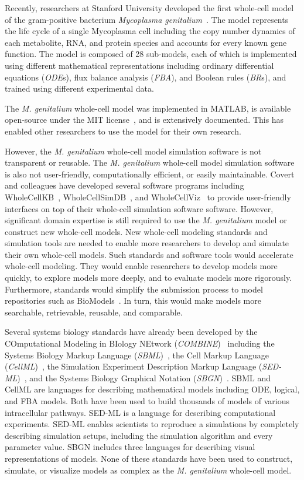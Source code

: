 \documentclass[journal,transmag]{IEEEtran}
\begin{document}
Recently, researchers at Stanford University developed the first whole-cell model of the gram-positive bacterium \textit{Mycoplasma genitalium}~\cite{Karr2012}. The model represents the life cycle of a single Mycoplasma cell including the copy number dynamics of each metabolite, RNA, and protein species and accounts for every known gene function. The model is composed of 28 sub-models, each of which is implemented using different mathematical representations including ordinary differential equations (\emph{ODE}s), flux balance analysis (\emph{FBA}), and Boolean rules (\emph{BR}s), and trained using different experimental data.

The \textit{M. genitalium} whole-cell model was implemented in MATLAB, is available open-source under the MIT license~\cite{wholeCell}, and is extensively documented. This has enabled other researchers to use the model for their own research. 

However, the \textit{M. genitalium} whole-cell model simulation software is not transparent or reusable. The \textit{M. genitalium} whole-cell model simulation software is also not user-friendly, computationally efficient, or easily maintainable. Covert and colleagues have developed several software programs including WholeCellKB~\cite{Karr2013}, WholeCellSimDB~\cite{Karr2014}, and WholeCellViz~\cite{Lee2013} to provide user-friendly interfaces on top of their whole-cell simulation software software. However, significant domain expertise is still required to use the \textit{M. genitalium} model or construct new whole-cell models. New whole-cell modeling standards and simulation tools are needed to enable more researchers to develop and simulate their own whole-cell models. Such standards and software tools would accelerate whole-cell modeling. They would enable researchers to develop models more quickly, to explore models more deeply, and to evaluate models more rigorously. Furthermore, standards would simplify the submission process to model repositories such as BioModels~\cite{juty2015biomodels,chelliah2015biomodels}. In turn, this would make models more searchable, retrievable, reusable, and comparable.

Several systems biology standards have already been developed by the COmputational Modeling in BIology NEtwork (\emph{COMBINE})~\cite{le2011meeting} including the Systems Biology Markup Language (\emph{SBML})~\cite{hucka2003}, the Cell Markup Language (\emph{CellML})~\cite{hedley_2001b}, the Simulation Experiment Description Markup Language (\emph{SED-ML})~\cite{sedml2011}, and the Systems Biology Graphical Notation (\emph{SBGN})~\cite{LeNovereHMMSS09}. SBML and CellML are languages for describing mathematical models including ODE, logical, and FBA models. Both have been used to build thousands of models of various intracellular pathways. SED-ML is a language for describing computational experiments. SED-ML enables scientists to reproduce a simulations by completely describing simulation setups, including the simulation algorithm and every parameter value. SBGN includes three languages for describing visual representations of models. None of these standards have been used to construct, simulate, or visualize models as complex as the \textit{M. genitalium} whole-cell model.
\end{document}
